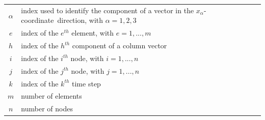 \begin{tabular}{cp{}}
  $\alpha$ & index used to identify the component of a vector in the \mbox{$ x_{\alpha} $-coordinate direction}, with $\alpha = 1, 2 ,3 $ \\  
  $e$ & index of the $e^{th}$ element, with $ e = 1, ..., m$ \\
  $h$ & index of the $h^{th}$ component of a column vector \\
  $i$ & index of the $i^{th}$ node, with $ i = 1, ..., n$ \\
  $j$ & index of the $j^{th}$ node, with $ j = 1, ..., n$ \\
  $k$ & index of the $k^{th}$ time step \\
  $m$ & number of elements \\
  $n$ & number of nodes
\end{tabular}\\

